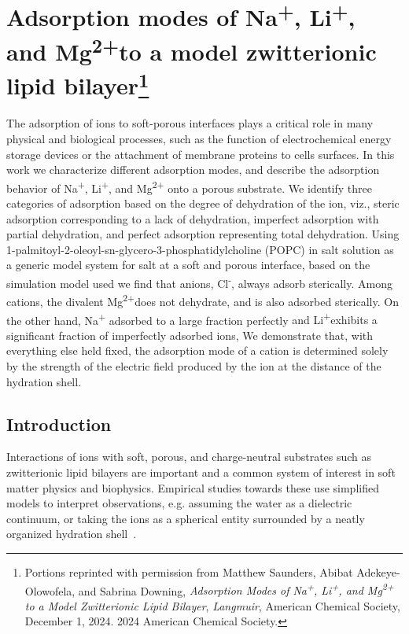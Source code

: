 \documentclass[12pt,openany,final]{book}
\newcommand{\na}{Na\textsuperscript{+}}
\newcommand{\li}{Li\textsuperscript{+}}
\newcommand{\mg}{Mg\textsuperscript{2+}}
\newcommand{\cl}{Cl\textsuperscript{-}}
\begin{document}
\clearpage
\clearpage
\clearpage
\clearpage

\chapter[Adsorption modes of \na, \li, and \mg to a model zwitterionic lipid bilayer]{Adsorption modes of \na, \li, and \mg to a model zwitterionic lipid bilayer\footnote{
    Portions reprinted with permission from Matthew Saunders, Abibat Adekeye-Olowofela, and Sabrina Downing, \textit{Adsorption Modes of Na\textsuperscript{+}, Li\textsuperscript{+}, and Mg\textsuperscript{2+} to a Model Zwitterionic Lipid Bilayer}, 
\textit{Langmuir}, American Chemical Society, December 1, 2024. 
\textcopyright{} 2024 American Chemical Society.
}}
    The adsorption of ions to soft-porous interfaces plays a critical role in 
    many physical and biological processes, such as the function of electrochemical 
    energy storage devices or 
    the attachment of membrane proteins to cells surfaces. 
    In this work we characterize different adsorption modes, and
    describe the adsorption behavior of Na\textsuperscript{+}, Li\textsuperscript{+}, and Mg\textsuperscript{2+} 
    {onto a porous substrate}.
    We identify three categories of adsorption based on 
    the degree of dehydration of the ion, 
    viz., steric adsorption {corresponding to a lack of dehydration}, 
    imperfect adsorption {with partial dehydration}, and 
    perfect adsorption {representing total dehydration}.
    Using 1-palmitoyl-2-oleoyl-sn-glycero-3-phosphatidylcholine (POPC) 
    in salt solution as a generic model system for salt at a soft and 
    porous interface, based on the simulation model used we find that 
    anions, \cl, always adsorb sterically. Among cations, the divalent
    \mg does not dehydrate, and is {also} adsorbed sterically. 
    On the other hand, \na  
    adsorbed to a large fraction perfectly 
    {and \li exhibits a significant fraction of imperfectly adsorbed ions,}
    We demonstrate that, with everything else held fixed, the 
    adsorption mode of a cation is determined
    solely by the strength of the electric field produced by the 
    ion at the distance of the hydration shell. 


\section{Introduction}
Interactions of ions with soft, porous, and charge-neutral substrates
such as zwitterionic lipid bilayers are important and a common
system of interest in soft matter physics and biophysics.
Empirical studies towards these use simplified
models to interpret observations, e.g. assuming the water as a
dielectric continuum,
or taking the ions as a spherical entity surrounded
by a neatly organized hydration shell~\cite{israelachvili:2011:intermol}.
\end{document}
